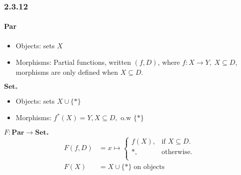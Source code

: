 \documentclass{article}
\begin{document}
\subsubsection*{2.3.12 }

\paragraph{Par}
\begin{itemize}
  \item Objects: sets $X$
   \item Morphisms: Partial functions, written $(f, D)$, where $f\colon X \rightarrow Y, \; X \subseteq D$, morphisms are only defined when $X \subseteq D$.
\end{itemize}

$\mathbf{Set_*}$
\begin{itemize}
  \item Objects: sets $X \cup \{*\}$
  \item Morphisms: $f^*(X) = Y, X \subseteq D, \text{ o.w } \{*\}$
\end{itemize}

$F\colon \mathbf{Par} \rightarrow \mathbf{Set_*}$
\begin{align*}
  F(f, D) &= x \mapsto \begin{cases}
    f(X), & \text{if $X \subseteq D$}.\\
    {*}, & \text{otherwise}.\\
  \end{cases} \\
  F(X) &= X \cup \{*\} \; \text{on objects}
\end{align*}
\end{document}

